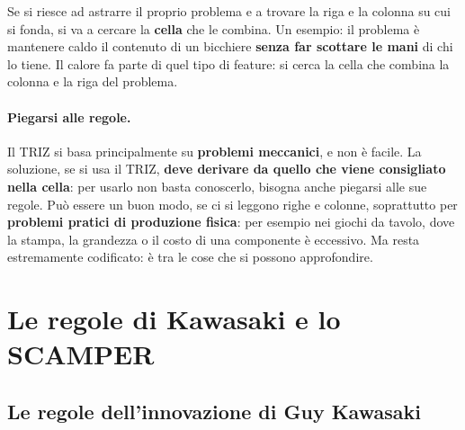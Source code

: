 Se si riesce ad astrarre il proprio problema e a trovare la riga e la
colonna su cui si fonda, si va a cercare la \textbf{cella} che le combina.
Un esempio: il problema è mantenere caldo il contenuto di un bicchiere
\textbf{senza far scottare le mani} di chi lo tiene. Il calore fa parte di
quel tipo di feature: si cerca la cella che combina la colonna e la riga del
problema.

\paragraph{Piegarsi alle regole.} Il TRIZ si basa principalmente su
\textbf{problemi meccanici}, e non è facile. La soluzione, se si usa il TRIZ,
\textbf{deve derivare da quello che viene consigliato nella cella}: per
usarlo non basta conoscerlo, bisogna anche piegarsi alle sue regole. Può
essere un buon modo, se ci si leggono righe e colonne, soprattutto per
\textbf{problemi pratici di produzione fisica}: per esempio nei giochi da
tavolo, dove la stampa, la grandezza o il costo di una componente è
eccessivo. Ma resta estremamente codificato: è tra le cose che si possono
approfondire.

\section{Le regole di Kawasaki e lo SCAMPER}
\label{sec:kawasaki-scamper}



\subsection{Le regole dell'innovazione di Guy Kawasaki}

